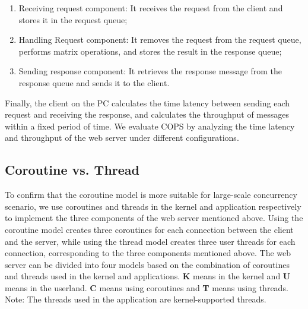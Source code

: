 \documentclass[sigconf,review,anonymous]{acmart}
\begin{document}
\begin{enumerate}[leftmargin=*]
    \item Receiving request component: It receives the request from the client and stores it in the request queue;
    \item Handling Request component: It removes the request from the request queue, performs matrix operations, and stores the result in the response queue;
    \item Sending response component: It retrieves the response message from the response queue and sends it to the client.
    
\end{enumerate}

Finally, the client on the PC calculates the time latency between sending each request and receiving the response, and calculates the throughput of messages within a fixed period of time. We evaluate COPS by analyzing the time latency and throughput of the web server under different configurations.

\subsection{Coroutine vs. Thread}

To confirm that the coroutine model is more suitable for large-scale concurrency scenario, we use coroutines and threads in the kernel and application respectively to implement the three components of the web server mentioned above. Using the coroutine model creates three coroutines for each connection between the client and the server, while using the thread model creates three user threads for each connection, corresponding to the three components mentioned above. The web server can be divided into four models based on the combination of coroutines and threads used in the kernel and applications. \textbf{K} means in the kernel and \textbf{U} means in the userland. \textbf{C} means using coroutines and \textbf{T} means using threads. Note: The threads used in the application are kernel-supported threads. 
\end{document}
